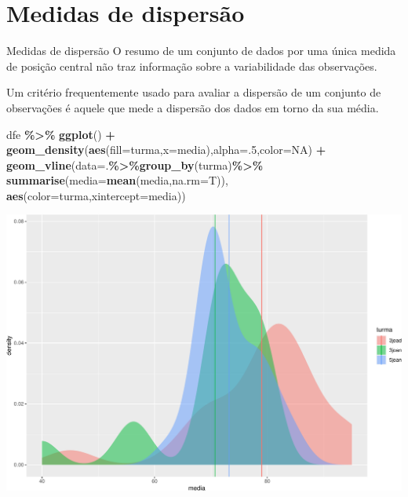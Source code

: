 \documentclass[
  9pt,
  ignorenonframetext,
  aspectratio=169]{beamer}
\newenvironment{Shaded}{\begin{snugshade}}{\end{snugshade}}
\newcommand{\DataTypeTok}[1]{\textcolor[rgb]{0.13,0.29,0.53}{#1}}
\newcommand{\DecValTok}[1]{\textcolor[rgb]{0.00,0.00,0.81}{#1}}
\newcommand{\KeywordTok}[1]{\textcolor[rgb]{0.13,0.29,0.53}{\textbf{#1}}}
\newcommand{\NormalTok}[1]{#1}
\newcommand{\OperatorTok}[1]{\textcolor[rgb]{0.81,0.36,0.00}{\textbf{#1}}}
\newcommand{\OtherTok}[1]{\textcolor[rgb]{0.56,0.35,0.01}{#1}}
\newcommand{\StringTok}[1]{\textcolor[rgb]{0.31,0.60,0.02}{#1}}
\begin{document}
\hypertarget{medidas-de-dispersuxe3o}{%
\section{Medidas de dispersão}\label{medidas-de-dispersuxe3o}}

\begin{frame}{Medidas de dispersão}
\protect\hypertarget{medidas-de-dispersuxe3o-1}{}
O resumo de um conjunto de dados por uma única medida de posição central
não traz informação sobre a variabilidade das observações.

Um critério frequentemente usado para avaliar a dispersão de um conjunto
de observações é aquele que mede a dispersão dos dados em torno da sua
média.
\end{frame}

\begin{frame}[fragile]{}
\protect\hypertarget{section-4}{}
\begin{Shaded}
\begin{Highlighting}[]
\NormalTok{dfe }\OperatorTok{\%\textgreater{}\%}
\StringTok{  }\KeywordTok{ggplot}\NormalTok{() }\OperatorTok{+}
\StringTok{  }\KeywordTok{geom\_density}\NormalTok{(}\KeywordTok{aes}\NormalTok{(}\DataTypeTok{fill=}\NormalTok{turma,}\DataTypeTok{x=}\NormalTok{media),}\DataTypeTok{alpha=}\NormalTok{.}\DecValTok{5}\NormalTok{,}\DataTypeTok{color=}\OtherTok{NA}\NormalTok{) }\OperatorTok{+}
\StringTok{  }\KeywordTok{geom\_vline}\NormalTok{(}\DataTypeTok{data=}\NormalTok{.}\OperatorTok{\%\textgreater{}\%}\KeywordTok{group\_by}\NormalTok{(turma)}\OperatorTok{\%\textgreater{}\%}
\StringTok{               }\KeywordTok{summarise}\NormalTok{(}\DataTypeTok{media=}\KeywordTok{mean}\NormalTok{(media,}\DataTypeTok{na.rm=}\NormalTok{T)),}
             \KeywordTok{aes}\NormalTok{(}\DataTypeTok{color=}\NormalTok{turma,}\DataTypeTok{xintercept=}\NormalTok{media))}
\end{Highlighting}
\end{Shaded}

\includegraphics{aula_08_files/figure-beamer/unnamed-chunk-10-1.pdf}
\end{frame}
\end{document}
